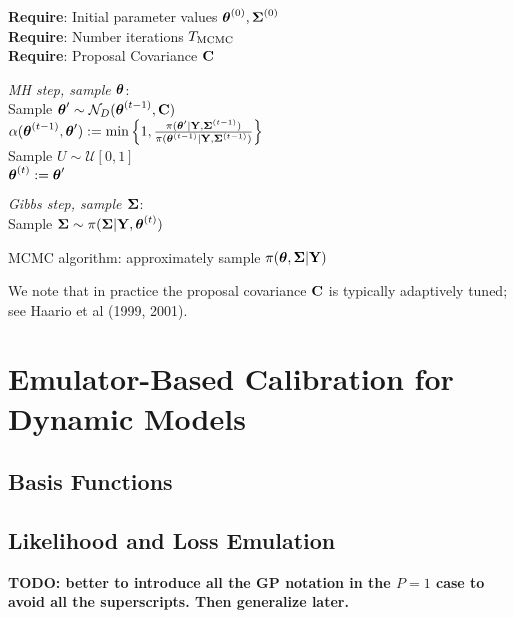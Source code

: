 \documentclass[12pt]{article}
\begin{document}
 \begin{algorithm}[H]
	\SetAlgoLined
	
	\textbf{Require}: Initial parameter values $\boldsymbol{\theta}^{(0)}, \boldsymbol{\Sigma}^{(0)}$ \\
	\textbf{Require}: Number iterations $T_{\text{MCMC}}$ \\
	\textbf{Require}: Proposal Covariance $\mathbf{C}$
		
	\bigskip
	
	 {
	\textit{MH step, sample $\boldsymbol{\theta}$}: \\[.2cm]
	Sample $\boldsymbol{\theta}^\prime \sim \mathcal{N}_{D}(\boldsymbol{\theta}^{(t - 1)}, \mathbf{C})$ \\
	$\alpha(\boldsymbol{\theta}^{(t - 1)}, \boldsymbol{\theta}^\prime) := \min\left\{1, \frac{\pi(\boldsymbol{\theta}^\prime|\mathbf{Y}, \boldsymbol{\Sigma}^{(t-1)})}{\pi(\boldsymbol{\theta}^{(t-1)}|\mathbf{Y}, \boldsymbol{\Sigma}^{(t-1)})} \right\}$ \\

	 Sample $U \sim \mathcal{U}[0, 1]$ \\
	  {
	 	$\boldsymbol{\theta}^{(t)} := \boldsymbol{\theta}^\prime$ \\
	 } 
	
	\bigskip
	
	\textit{Gibbs step, sample $\boldsymbol{\Sigma}$}: \\[.2cm]
	Sample $\boldsymbol{\Sigma} \sim  \pi(\boldsymbol{\Sigma} | \mathbf{Y}, \boldsymbol{\theta}^{(t)})$
}
\caption{MCMC algorithm: approximately sample $\pi(\boldsymbol{\theta}, \boldsymbol{\Sigma}|\mathbf{Y})$}
\end{algorithm}
We note that in practice the proposal covariance $\mathbf{C}$ is typically adaptively tuned; see Haario et al (1999, 2001).  

\section{Emulator-Based Calibration for Dynamic Models}

\subsection{Basis Functions}

\subsection{Likelihood and Loss Emulation}
\textbf{TODO: better to introduce all the GP notation in the $P = 1$ case to avoid all the superscripts. Then generalize later.}
\end{document}
